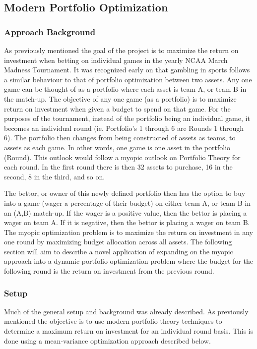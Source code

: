 \documentclass[12pt]{article}
\begin{document}
\subsection{Modern Portfolio Optimization}
\subsubsection{Approach Background}
As previously mentioned the goal of the project is to maximize the return on investment when betting on individual games in the yearly NCAA March Madness Tournament.
It was recognized early on that gambling in sports follows a similar behaviour to that of portfolio optimization between two assets. 
Any one game can be thought of as a portfolio where each asset is team A, or team B in the match-up.
The objective of any one game (as a portfolio) is to maximize return on investment when given a budget to spend on that game.
For the purposes of the tournament, instead of the portfolio being an individual game, it becomes an individual round (ie. Portfolio's 1 through 6 are Rounds 1 through 6).
The portfolio then changes from being constructed of assets as teams, to assets as each game.
In other words, one game is one asset in the portfolio (Round).
This outlook would follow a myopic outlook on Portfolio Theory for each round.
In the first round there is then 32 assets to purchase, 16 in the second, 8 in the third, and so on.

The bettor, or owner of this newly defined portfolio then has the option to buy into a game (wager a percentage of their budget) on either team A, or team B in an (A,B) match-up. 
If the wager is a positive value, then the bettor is placing a wager on team A.
If it is negative, then the bettor is placing a wager on team B.
The myopic optimization problem is to maximize the return on investment in any one round by maximizing budget allocation across all assets. 
The following section will aim to describe a novel application of expanding on the myopic approach into a dynamic portfolio optimization problem where the budget for the following round is the return on investment from the previous round.


\subsubsection{Setup}
Much of the general setup and background was already described. 
As previously mentioned the objective is to use modern portfolio theory techniques to determine a maximum return on investment for an individual round basis.
This is done using a mean-variance optimization approach described below.
\end{document}
